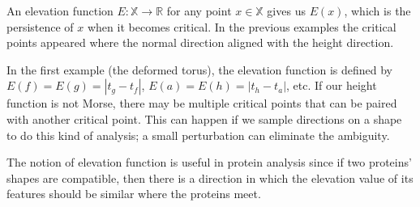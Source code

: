 \documentclass[12pt,oneside,openright]{memoir}
\begin{document}
An elevation function $E:\mathbb{X}\to\mathbb{R}$ for any point $x\in\mathbb{X}$ gives us $E(x)$, which is the persistence of $x$ when it becomes critical. In the previous examples the critical points appeared where the normal direction aligned with the height direction.

In the first example (the deformed torus), the elevation function is defined by $E(f)=E(g)=|t_g-t_f|$, $E(a)=E(h)=|t_h-t_a|$, etc. If our height function is not Morse, there may be multiple critical points that can be paired with another critical point. This can happen if we sample directions on a shape to do this kind of analysis; a small perturbation can eliminate the ambiguity.

The notion of elevation function is useful in protein analysis since if two proteins' shapes are compatible, then there is a direction in which the elevation value of its features should be similar where the proteins meet.
\end{document}
